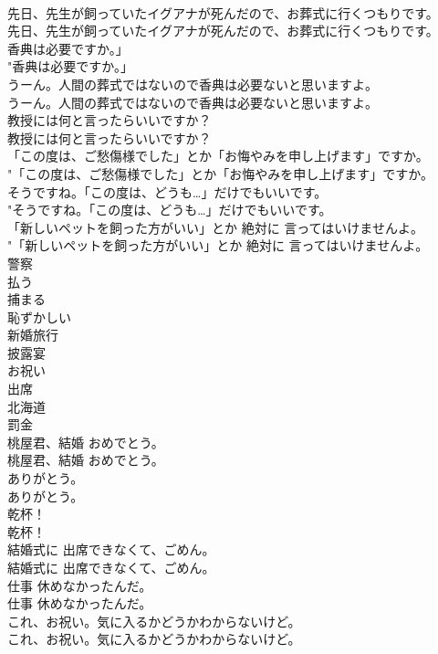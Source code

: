\documentclass[8pt]{extreport}
\begin{document}
\begin{CJK}{UTF8}{min}
\\	先日、先生が飼っていたイグアナが死んだので、お葬式に行くつもりです。	
\\	先日、先生が飼っていたイグアナが死んだので、お葬式に行くつもりです。 
\\	香典は必要ですか。」	
\\	"香典は必要ですか。」 
\\	うーん。人間の葬式ではないので香典は必要ないと思いますよ。	
\\	うーん。人間の葬式ではないので香典は必要ないと思いますよ。 
\\	教授には何と言ったらいいですか？	
\\	教授には何と言ったらいいですか？ 
\\	「この度は、ご愁傷様でした」とか「お悔やみを申し上げます」ですか。	
\\	"「この度は、ご愁傷様でした」とか「お悔やみを申し上げます」ですか。 
\\	そうですね。「この度は、どうも…」だけでもいいです。	
\\	"そうですね。「この度は、どうも…」だけでもいいです。 
\\	「新しいペットを飼った方がいい」とか 絶対に 言ってはいけませんよ。	
\\	"「新しいペットを飼った方がいい」とか 絶対に 言ってはいけませんよ。 
\\	警察
\\	払う
\\	捕まる
\\	恥ずかしい
\\	新婚旅行
\\	披露宴
\\	お祝い
\\	出席
\\	北海道
\\	罰金
\\	桃屋君、結婚 おめでとう。	
\\	桃屋君、結婚 おめでとう。 
\\	ありがとう。	
\\	ありがとう。 
\\	乾杯！	
\\	乾杯！ 
\\	結婚式に 出席できなくて、ごめん。	
\\	結婚式に 出席できなくて、ごめん。 
\\	仕事 休めなかったんだ。	
\\	仕事 休めなかったんだ。 
\\	これ、お祝い。気に入るかどうかわからないけど。	
\\	これ、お祝い。気に入るかどうかわからないけど。 

\end{CJK}
\end{document}
